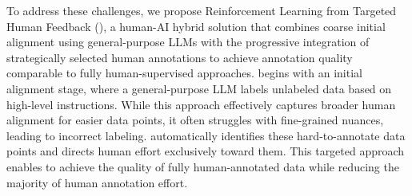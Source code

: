 To address these challenges, we propose Reinforcement Learning from Targeted Human Feedback (\myname{}), a human-AI hybrid solution that combines coarse initial alignment using general-purpose LLMs with the progressive integration of strategically selected human annotations to achieve annotation quality comparable to fully human-supervised approaches. \myname{} begins with an initial alignment stage, where a general-purpose LLM labels unlabeled data based on high-level instructions. While this approach effectively captures broader human alignment for easier data points, it often struggles with fine-grained nuances, leading to incorrect labeling. \myname{} automatically identifies these hard-to-annotate data points and directs human effort exclusively toward them. This targeted approach enables \myname{} to achieve the quality of fully human-annotated data while reducing the majority of human annotation effort.






